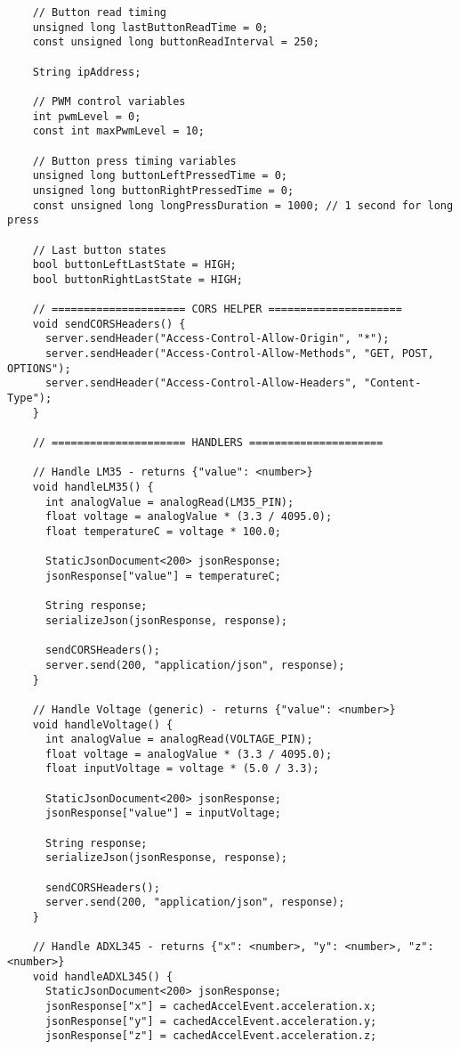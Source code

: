 \begin{verbatim}
    // Button read timing
    unsigned long lastButtonReadTime = 0;
    const unsigned long buttonReadInterval = 250;
    
    String ipAddress;
    
    // PWM control variables
    int pwmLevel = 0;             
    const int maxPwmLevel = 10;   
    
    // Button press timing variables
    unsigned long buttonLeftPressedTime = 0;
    unsigned long buttonRightPressedTime = 0;
    const unsigned long longPressDuration = 1000; // 1 second for long press
    
    // Last button states
    bool buttonLeftLastState = HIGH;
    bool buttonRightLastState = HIGH;
    
    // ===================== CORS HELPER =====================
    void sendCORSHeaders() {
      server.sendHeader("Access-Control-Allow-Origin", "*");
      server.sendHeader("Access-Control-Allow-Methods", "GET, POST, OPTIONS");
      server.sendHeader("Access-Control-Allow-Headers", "Content-Type");
    }
    
    // ===================== HANDLERS =====================
    
    // Handle LM35 - returns {"value": <number>}
    void handleLM35() {
      int analogValue = analogRead(LM35_PIN);
      float voltage = analogValue * (3.3 / 4095.0);
      float temperatureC = voltage * 100.0;
    
      StaticJsonDocument<200> jsonResponse;
      jsonResponse["value"] = temperatureC;
    
      String response;
      serializeJson(jsonResponse, response);
    
      sendCORSHeaders();
      server.send(200, "application/json", response);
    }
    
    // Handle Voltage (generic) - returns {"value": <number>}
    void handleVoltage() {
      int analogValue = analogRead(VOLTAGE_PIN);
      float voltage = analogValue * (3.3 / 4095.0);
      float inputVoltage = voltage * (5.0 / 3.3);
    
      StaticJsonDocument<200> jsonResponse;
      jsonResponse["value"] = inputVoltage;
    
      String response;
      serializeJson(jsonResponse, response);
    
      sendCORSHeaders();
      server.send(200, "application/json", response);
    }
    
    // Handle ADXL345 - returns {"x": <number>, "y": <number>, "z": <number>}
    void handleADXL345() {
      StaticJsonDocument<200> jsonResponse;
      jsonResponse["x"] = cachedAccelEvent.acceleration.x;
      jsonResponse["y"] = cachedAccelEvent.acceleration.y;
      jsonResponse["z"] = cachedAccelEvent.acceleration.z;
    

\end{verbatim}

